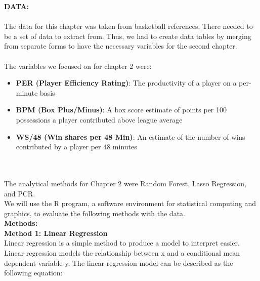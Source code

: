 \documentclass[11pt,letterpaper]{amsart}
\begin{document}
\noindent \textbf{{\large DATA:}} \\\\
\indent The data for this chapter was taken from basketball references. There needed to be a set of data to extract from. Thus, we had to create data tables by merging from separate forms to have the necessary variables for the second chapter.
\\ \\
The variables we focused on for chapter 2 were:\\
\noindent
\begin{itemize}
\item \textbf{PER (Player Efficiency Rating)}: The productivity of a player on a per-minute basis
\item \textbf{BPM (Box Plus/Minus)}: A box score estimate of points per 100 possessions a player contributed above league average
\item \textbf{WS/48 (Win shares per 48 Min)}: An estimate of the number of wins contributed by a player per 48 minutes
\end{itemize}
\cite{6}\\\\
\indent The analytical methods for Chapter 2 were Random Forest, Lasso Regression, and PCR.\\
\indent We will use the R program, a software environment for statistical computing and graphics, to evaluate the following methods with the data.
\\



\noindent \Large \textbf{Methods:}\\

\noindent \large \textbf{Method 1: Linear Regression}\\
\indent Linear regression is a simple method to produce a model to interpret easier. Linear regression models the relationship between x and a conditional mean dependent variable y. The linear regression model can be described as the following equation:
\end{document}
